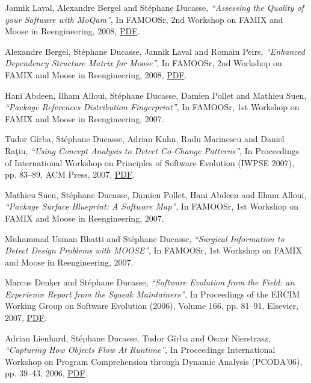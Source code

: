 \documentclass{article}
\newcommand{\czauthors}[1]{#1}
\newcommand{\cztitle}[1]{\emph{``#1''}}
\newcommand{\czbooktitle}[1]{#1}
\begin{document}
\begin{itemize}
	\pub  \czauthors{Jannik Laval, Alexandre Bergel and St\'ephane Ducasse},  \cztitle{Assessing the Quality of your Software with MoQam},  In \czbooktitle{FAMOOSr, 2nd Workshop on FAMIX and Moose in Reengineering}, 2008, \href{http://rmod-files.lille.inria.fr/Team/Texts/Papers/Lava08a-Famoosr2008-MoQam.pdf}{PDF}.

	\pub  \czauthors{Alexandre Bergel, St\'ephane Ducasse, Jannik Laval and Romain Peirs},  \cztitle{Enhanced Dependency Structure Matrix for Moose},  In \czbooktitle{FAMOOSr, 2nd Workshop on FAMIX and Moose in Reengineering}, 2008, \href{http://rmod-files.lille.inria.fr/Team/Texts/Papers/Berg08c-Famoosr2008-DSM.pdf}{PDF}.

	\pub  \czauthors{Hani Abdeen, Ilham Alloui, St\'ephane Ducasse, Damien Pollet and Mathieu Suen},  \cztitle{Package References Distribution Fingerprint},  In \czbooktitle{FAMOOSr, 1st Workshop on FAMIX and Moose in Reengineering}, 2007.

	\pub  \czauthors{Tudor G\^irba, St\'ephane Ducasse, {A}drian {K}uhn, Radu Marinescu and Daniel Ra\c{t}iu},  \cztitle{Using Concept Analysis to Detect Co-Change Patterns},  In \czbooktitle{Proceedings of International Workshop on Principles of Software Evolution (IWPSE 2007)}, pp. 83--89, ACM Press, 2007, \href{http://rmod-files.lille.inria.fr/Team/Texts/Papers/Girb07aCoChangePatterns.pdf}{PDF}.

	\pub  \czauthors{Mathieu Suen, St\'ephane Ducasse, Damien Pollet, Hani Abdeen and Ilham Alloui},  \cztitle{Package Surface Blueprint: A Software Map},  In \czbooktitle{FAMOOSr, 1st Workshop on FAMIX and Moose in Reengineering}, 2007.

	\pub  \czauthors{Muhammad Usman Bhatti and St\'ephane Ducasse},  \cztitle{Surgical Information to Detect Design Problems with MOOSE},  In \czbooktitle{FAMOOSr, 1st Workshop on FAMIX and Moose in Reengineering}, 2007.

	\pub  \czauthors{Marcus Denker and St\'ephane Ducasse},  \cztitle{Software Evolution from the Field: an Experience Report from the {Squeak} Maintainers},  In \czbooktitle{Proceedings of the ERCIM Working Group on Software Evolution (2006)}, Volume 166, pp. 81--91, Elsevier, 2007, \href{http://rmod-files.lille.inria.fr/Team/Texts/Papers/Denk07a-Ercim06-EvolutionSqueak.pdf}{PDF}.

	\pub  \czauthors{Adrian Lienhard, St\'ephane Ducasse, Tudor G\^irba and Oscar Nierstrasz},  \cztitle{Capturing How Objects Flow At Runtime},  In \czbooktitle{Proceedings International Workshop on Program Comprehension through Dynamic Analysis (PCODA'06)}, pp. 39--43, 2006, \href{http://rmod-files.lille.inria.fr/Team/Texts/Papers/Lien06aCapturingHowObjectsFlowPCODA06.pdf http://www.lore.ua.ac.be/Events/PCODA2006/pcoda2006proceedings.pdf}{PDF}.


\end{itemize}
\end{document}
